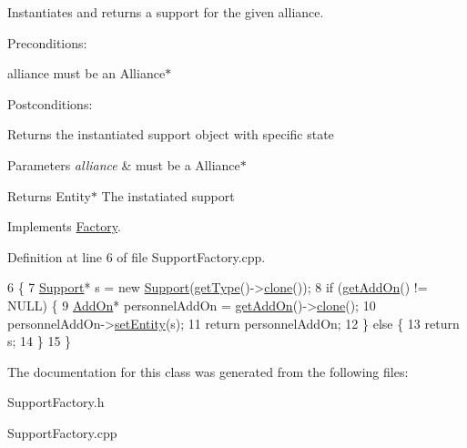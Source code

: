 Instantiates and returns a support for the given alliance. 

Preconditions\+:
\begin{DoxyItemize}
\item alliance must be an Alliance$\ast$
\end{DoxyItemize}

Postconditions\+:
\begin{DoxyItemize}
\item Returns the instantiated support object with specific state
\end{DoxyItemize}


\begin{DoxyParams}{Parameters}
{\em alliance} & must be a Alliance$\ast$ \\
\hline
\end{DoxyParams}
\begin{DoxyReturn}{Returns}
Entity$\ast$ The instatiated support 
\end{DoxyReturn}


Implements \hyperlink{classFactory}{Factory}.



Definition at line 6 of file Support\+Factory.\+cpp.


\begin{DoxyCode}
6                                                        \{
7     \hyperlink{classSupport}{Support}* s = \textcolor{keyword}{new} \hyperlink{classSupport}{Support}(\hyperlink{classFactory_ac91051006ace7ec5bb6ecf0fe6d02d58}{getType}()->\hyperlink{classSupportFactory_a802c25e901b479656ea95a5678a1ad26}{clone}());
8     \textcolor{keywordflow}{if} (\hyperlink{classFactory_a994153930f59cafb280e91d5b100b5aa}{getAddOn}() != NULL) \{
9         \hyperlink{classAddOn}{AddOn}* personnelAddOn = \hyperlink{classFactory_a994153930f59cafb280e91d5b100b5aa}{getAddOn}()->\hyperlink{classAddOn_a5a090bf8b4e7260aa35d6f5b9d151955}{clone}();
10         personnelAddOn->\hyperlink{classAddOn_ac9f4263e3558015fdad46adefceed197}{setEntity}(s);
11         \textcolor{keywordflow}{return} personnelAddOn;
12     \} \textcolor{keywordflow}{else} \{
13         \textcolor{keywordflow}{return} s;
14     \}
15 \}
\end{DoxyCode}


The documentation for this class was generated from the following files\+:\begin{DoxyCompactItemize}
\item 
Support\+Factory.\+h\item 
Support\+Factory.\+cpp\end{DoxyCompactItemize}
